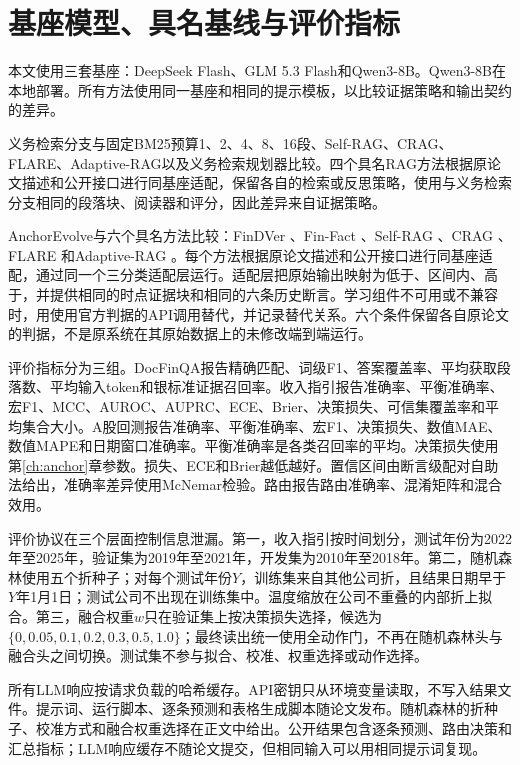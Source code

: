 \section{基座模型、具名基线与评价指标}

本文使用三套基座：DeepSeek Flash、GLM 5.3 Flash和Qwen3-8B\citep{qwen2025qwen3}。Qwen3-8B在本地部署。所有方法使用同一基座和相同的提示模板，以比较证据策略和输出契约的差异。

义务检索分支与固定BM25预算1、2、4、8、16段、Self-RAG、CRAG、FLARE、Adaptive-RAG以及义务检索规划器比较。四个具名RAG方法根据原论文描述和公开接口进行同基座适配，保留各自的检索或反思策略，使用与义务检索分支相同的段落块、阅读器和评分，因此差异来自证据策略。

AnchorEvolve与六个具名方法比较：FinDVer \citep{zhao2024findver}、Fin-Fact \citep{rangapur2025finfact}、Self-RAG \citep{asai2024selfrag}、CRAG \citep{yan2024crag}、FLARE \citep{jiang2023flare}和Adaptive-RAG \citep{jeong2024adaptiverag}。每个方法根据原论文描述和公开接口进行同基座适配，通过同一个三分类适配层运行。适配层把原始输出映射为低于、区间内、高于，并提供相同的时点证据块和相同的六条历史断言。学习组件不可用或不兼容时，用使用官方判据的API调用替代，并记录替代关系。六个条件保留各自原论文的判据，不是原系统在其原始数据上的未修改端到端运行。

评价指标分为三组。DocFinQA报告精确匹配、词级F1、答案覆盖率、平均获取段落数、平均输入token和银标准证据召回率。收入指引报告准确率、平衡准确率、宏F1、MCC、AUROC、AUPRC、ECE、Brier、决策损失、可信集覆盖率和平均集合大小。A股回测报告准确率、平衡准确率、宏F1、决策损失、数值MAE、数值MAPE和日期窗口准确率。平衡准确率是各类召回率的平均\citep{brodersen2010balanced,sokolova2009performance}。决策损失使用第\ref{ch:anchor}章参数。损失、ECE和Brier越低越好。置信区间由断言级配对自助法给出，准确率差异使用McNemar检验。路由报告路由准确率、混淆矩阵和混合效用。

评价协议在三个层面控制信息泄漏。第一，收入指引按时间划分，测试年份为2022年至2025年，验证集为2019年至2021年，开发集为2010年至2018年。第二，随机森林使用五个折种子；对每个测试年份$Y$，训练集来自其他公司折，且结果日期早于$Y$年1月1日；测试公司不出现在训练集中。温度缩放在公司不重叠的内部折上拟合。第三，融合权重$w$只在验证集上按决策损失选择，候选为$\{0,0.05,0.1,0.2,0.3,0.5,1.0\}$；最终读出统一使用全动作门，不再在随机森林头与融合头之间切换。测试集不参与拟合、校准、权重选择或动作选择。

所有LLM响应按请求负载的哈希缓存。API密钥只从环境变量读取，不写入结果文件。提示词、运行脚本、逐条预测和表格生成脚本随论文发布。随机森林的折种子、校准方式和融合权重选择在正文中给出。公开结果包含逐条预测、路由决策和汇总指标；LLM响应缓存不随论文提交，但相同输入可以用相同提示词复现。

